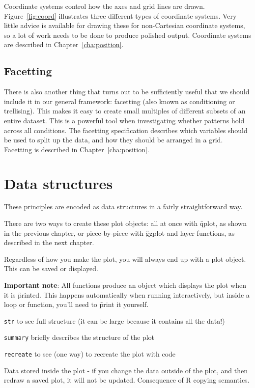 Coordinate systems control how the axes and grid lines are drawn.  Figure~\ref{fig:coord} illustrates three different types of coordinate systems.  Very little advice is available for drawing these for non-Cartesian coordinate systems, so a lot of work needs to be done to produce polished output.  Coordinate systems are described in Chapter~\ref{cha:position}.

% 

\subsection{Facetting}\label{sec:intro-facetting}

There is also another thing that turns out to be sufficiently useful that we should include it in our general framework: facetting (also known as conditioning or trellising). This makes it easy to create small multiples of different subsets of an entire dataset. This is a powerful tool when investigating whether patterns hold across all conditions.  The facetting specification describes which variables should be used to split up the data, and how they should be arranged in a grid.  Facetting is described in Chapter~\ref{cha:position}.

\section{Data structures}
\label{sec:data-structures}

These principles are encoded as data structures in a fairly straightforward way.

There are two ways to create these plot objects: all at once with \f{qplot}, as shown in the previous chapter, or piece-by-piece with \f{ggplot} and layer functions, as described in the next chapter.

Regardless of how you make the plot, you will always end up with a plot object.  This can be saved or displayed.

{\bf Important note}: All \ggplot functions produce an object which displays the plot when it is \f{print}ed.  This happens automatically when
running interactively, but inside a loop or function, you'll need to
\f{print} it yourself.  

{\tt str} to see full structure (it can be large because it contains all the data!)

{\tt summary} briefly describes the structure of the plot

{\tt recreate} to see (one way) to recreate the plot with code 

Data stored inside the plot - if you change the data outside of the plot, and then redraw a saved plot, it will not be updated.  Consequence of R copying semantics.

